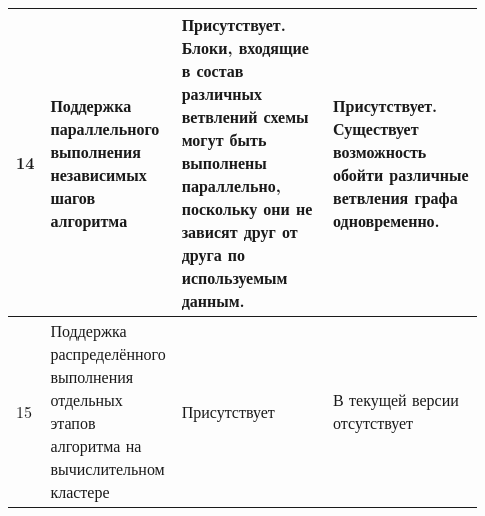 \begin{landscape}
\begin{longtable}{|p{0.03\linewidth}|p{0.2\linewidth}|p{0.35\linewidth}|p{0.35\linewidth}|}
        \hline
        14         & Поддержка параллельного выполнения независимых шагов алгоритма                             & Присутствует. Блоки, входящие в состав различных ветвлений схемы могут быть выполнены параллельно, поскольку они не зависят друг от друга по используемым данным.                                                                                                                                                                                                                                                                                                                                                                                                                                                                                                 & Присутствует. Существует возможность обойти различные ветвления графа одновременно.                                                                                                                                                                                               \\
        \hline
        15         & Поддержка распределённого выполнения отдельных этапов алгоритма на вычислительном кластере & Присутствует                                                                                                                                                                                                                                                                                                                                                                                                                                                                                                                                                                                                                                                      & В текущей версии отсутствует                                                                                                                                                                                                                                                      \\
        \hline

\end{longtable}
\end{landscape}
